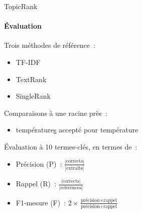 \begin{frame}{TopicRank}\framesubtitle{Évaluation}
  Trois méthodes de référence~:
  \begin{itemize}
    \item{TF-IDF~\cite{salton1975tfidf}}
    \item{TextRank~\cite{mihalcea2004textrank}}
    \item{SingleRank~\cite{wan2008expandrank}}
  \end{itemize}

  \vspace{1em}

  Comparaisons à une racine près~:
  \begin{itemize}
    \item{\og{}température\underline{s}\fg{} accepté pour \og{}température\fg{}}
  \end{itemize}

  \vspace{1em}

  Évaluation à 10 termes-clés, en termes de~:
  \begin{itemize}
    \item{Précision (P)~: $\frac{|\text{corrects}|}{|\text{extraits}|}$}
    \item{Rappel (R)~: $\frac{|\text{corrects}|}{|\text{references}|}$}
    \item{F1-mesure (F)~: $2 \times \frac{\text{précision} \times \text{rappel}}{\text{précision} + \text{rappel}}$}
  \end{itemize}
\end{frame}

